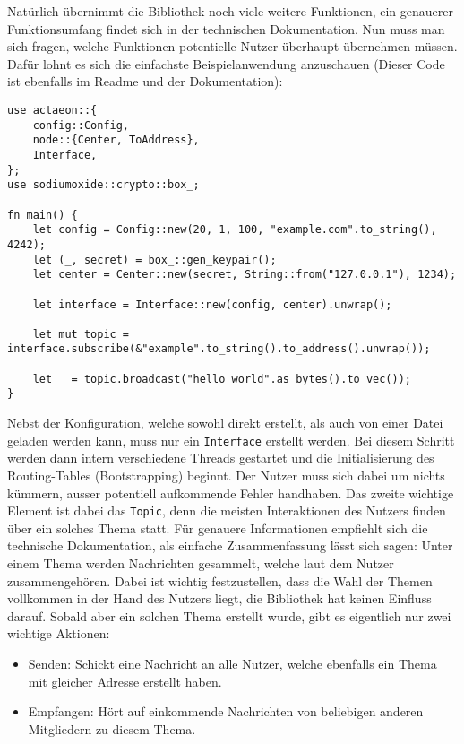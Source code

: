 \documentclass[11pt]{article}
\begin{document}
\noindent Natürlich übernimmt die Bibliothek noch viele weitere
Funktionen, ein genauerer Funktionsumfang findet sich in der
technischen Dokumentation. Nun muss man sich fragen, welche Funktionen
potentielle Nutzer überhaupt übernehmen müssen. Dafür lohnt es sich
die einfachste Beispielanwendung anzuschauen (Dieser Code ist
ebenfalls im Readme und der Dokumentation):
\begin{verbatim}
use actaeon::{
    config::Config,
    node::{Center, ToAddress},
    Interface,
};
use sodiumoxide::crypto::box_;

fn main() {
    let config = Config::new(20, 1, 100, "example.com".to_string(), 4242);
    let (_, secret) = box_::gen_keypair();
    let center = Center::new(secret, String::from("127.0.0.1"), 1234);

    let interface = Interface::new(config, center).unwrap();

    let mut topic = interface.subscribe(&"example".to_string().to_address().unwrap());

    let _ = topic.broadcast("hello world".as_bytes().to_vec());
}
\end{verbatim}

\noindent Nebst der Konfiguration, welche sowohl direkt erstellt, als
auch von einer Datei geladen werden kann, muss nur ein \texttt{Interface}
erstellt werden. Bei diesem Schritt werden dann intern verschiedene
Threads gestartet und die Initialisierung des Routing-Tables
(Bootstrapping) beginnt. Der Nutzer muss sich dabei um nichts kümmern,
ausser potentiell aufkommende Fehler handhaben. Das zweite wichtige
Element ist dabei das \texttt{Topic}, denn die meisten Interaktionen des
Nutzers finden über ein solches Thema statt. Für genauere
Informationen empfiehlt sich die technische Dokumentation, als
einfache Zusammenfassung lässt sich sagen: Unter einem Thema werden
Nachrichten gesammelt, welche laut dem Nutzer zusammengehören. Dabei
ist wichtig festzustellen, dass die Wahl der Themen vollkommen in der
Hand des Nutzers liegt, die Bibliothek hat keinen Einfluss darauf.
Sobald aber ein solchen Thema erstellt wurde, gibt es eigentlich nur
zwei wichtige Aktionen: 
\begin{itemize}
\item Senden: Schickt eine Nachricht an alle Nutzer, welche ebenfalls ein
Thema mit gleicher Adresse erstellt haben.
\item Empfangen: Hört auf einkommende Nachrichten von beliebigen anderen
Mitgliedern zu diesem Thema.
\end{itemize}
\end{document}
